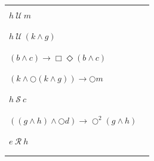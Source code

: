 \documentclass[12pt]{article}
\begin{document}
\begin{enumerate}
\begin{table}
\begin{tabular}{|l|l|}
&\\

\hline

&\\
		
$h ~\mathcal{U}~ m$									 &\\

&\\

\hline

&\\
		
$h ~\mathcal{U}~ (k \wedge g)$						 &\\

&\\

\hline

&\\
		
$(b \wedge c) \rightarrow \Box \Diamond (b \wedge c)$  &\\

&\\

\hline

&\\
		
$(k \wedge \bigcirc (k \wedge g)) \rightarrow \bigcirc m$  &\\

&\\

\hline

&\\
		
$ h ~\mathcal{S}~ c$								 &\\

&\\

\hline

&\\
		
$ ((g \wedge h) \wedge \bigcirc d) \rightarrow \bigcirc^{2} (g \wedge h)$  &\\

&\\

\hline

&\\
		
$e ~\mathcal{R}~ h$									 &\\

&\\

\hline

&\\
		

\end{tabular}
\end{table}
\end{enumerate}
\end{document}
